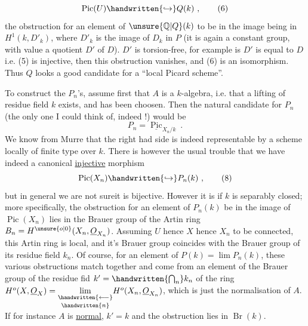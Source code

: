 \[
\operatorname{Pic}(U)\handwritten{\hookrightarrow}Q(k)\ ,
\tag*{(6)}
\]
the obstruction for an element of $\unsure{\mathbb{Q}|Q}(k)$ to be in the image being in $H^1(k,D'_k)$, where $D'_k$ is the image of $D_k$ in $P$ (it is again a constant group, with value a quotient $D'$ of $D$).   $D'$ is torsion-free, for example is $D'$ is equal to $D$ i.e. (5) is injective, then this obstruction vanishes, and  (6) is an isomorphism. Thus $Q$ looks a good candidate for a ``local Picard scheme''.

To construct the $P_n$'s, assume first that $A$ is a $k$-algebra, i.e. that a lifting of   residue field $k$ exists, and has been choosen. Then the natural candidate for $P_n$ (the only one I could think of, indeed !) would be
\[
P_n=\underline{\operatorname{Pic}}_{X_n/k}\ .
\tag*{(7)}
\]
We know from Murre that the right had side is indeed representable by a scheme locally of finite type over $k$. There is however the usual trouble that we have indeed a canonical \uline{injective} morphism
\[
\operatorname{Pic}(X_n)\handwritten{\hookrightarrow}P_n(k)\ ,
\tag*{(8)}
\]
but in general we are not sureit is bijective. However it is if $k$ is separably closed; more specifically, the obstruction for an element of $P_n(k)$  be in the image of $\operatorname{Pic}(X_n)$ lies in the Brauer group  
of the Artin ring $B_n=H^{\unsure{o|0}}(X_n,\underline{O}_{X_n})$. Assuming $U$ hence $X$ hence $X_n$ to be connected, this Artin ring is local, and it's Brauer group coincides with the Brauer group of its residue field $k_n$. Of course,  for an element of $P(k)=\lim P_n(k)$, these various obstructions match together and come from an element of the Brauer group of the residue fid $k'=\handwritten{\bigcap_n}k_n$ of the ring $H^o(X,\underline{O}_X)=\underset{\handwritten{n}}{\underset{\handwritten{\longleftarrow}}{\lim}}H^o(X_n,\underline{O}_{X_n})$,  which is just the normalisation of $A$. If for instance $A$ is \uline{normal},  $k'=k$ and the obstruction lies in $\operatorname{Br}(k)$.

